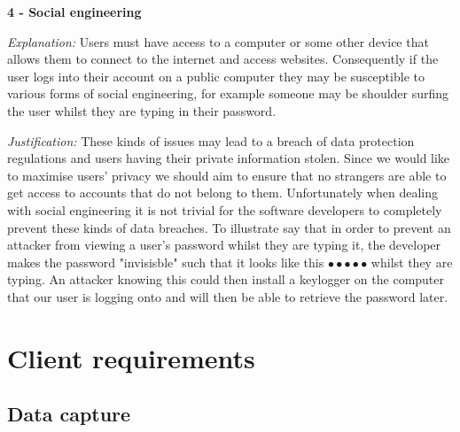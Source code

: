 \textbf{4 - Social engineering} \\ \vspace{0.1cm}

\textit{Explanation:}
Users must have access to a computer or some other device that
allows them to connect to the internet and access websites. 
Consequently if the user logs into their account on a public 
computer they may be susceptible to various forms of social 
engineering, for example someone may be shoulder surfing the 
user whilst they are typing in their password. \vspace{0.1cm}

\textit{Justification:}
These kinds of issues may lead to a breach of data protection
regulations and users having their private information stolen.
Since we would like to maximise users' privacy we should aim 
to ensure that no strangers are able to get access to accounts
that do not belong to them. Unfortunately when dealing with 
social engineering it is not trivial for the software 
developers to completely prevent these kinds of data breaches.
To illustrate say that in order to prevent an attacker from 
viewing a user's password whilst they are typing it, the 
developer makes the password "invisisble" such that it looks
like this  $\bullet \bullet \bullet \bullet \bullet$ whilst
they are typing. An attacker knowing this could then install 
a keylogger on the computer that our user is logging onto and
will then be able to retrieve the password later.

\section{Client requirements}

\subsection{Data capture}

